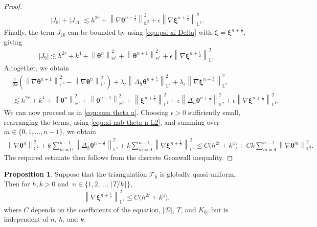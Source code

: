 \documentclass[11pt, reqno]{amsart}
\theoremstyle{definition}
\newtheorem{proposition}[theorem]{Proposition}
\theoremstyle{remark}
\numberwithin{equation}{section}
\newcommand{\bff}{\boldsymbol}
\newcommand{\bb}{\mathbb}
\newcommand{\norm}[2]{\left\|{#1}\right\|_{#2}}
\newcommand{\abs}[1]{\left|{#1}\right|}
\begin{document}
\begin{proof}
\begin{align*}
	\abs{J_8}+\abs{J_{11}}
	\lesssim
	h^{2r}+
	\norm{\nabla \bff{\theta}^{n+\frac{1}{2}}}{\bb{L}^2}^2 + \epsilon \norm{\nabla \bff{\xi}^{n+\frac{1}{2}}}{\bb{L}^2}^2.
\end{align*}
Finally, the term $J_{10}$ can be bounded by using \eqref{equ:psi xi Delta} with $\bff{\zeta}=\bff{\xi}^{n+\frac{1}{2}}$, giving
\begin{align*}
	\abs{J_9} 
	\lesssim
	h^{2r}+k^4+ \norm{\bff{\theta}^n}{\bb{H}^1}^2 + \norm{\bff{\theta}^{n+1}}{\bb{H}^1}^2
	+ \epsilon \norm{\nabla \bff{\xi}^{n+\frac{1}{2}}}{\bb{L}^2}^2.
\end{align*}
Altogether, we obtain
\begin{align*}
	&\frac{1}{2k} \left(\norm{\nabla \bff{\theta}^{n+1}}{\bb{L}^2}^2 - \norm{\nabla \bff{\theta}^n}{\bb{L}^2}^2 \right) 
	+
	\lambda_r \norm{\Delta_h \bff{\theta}^{n+\frac{1}{2}}}{\bb{L}^2}^2
	+
	\lambda_e \norm{\nabla \bff{\xi}^{n+\frac{1}{2}}}{\bb{L}^2}^2
	\\
	&\lesssim
	h^{2r}+k^4 + \norm{\bff{\theta}^n}{\bb{H}^1}^2 + \norm{\bff{\theta}^{n+1}}{\bb{H}^1}^2
	+
	\norm{\bff{\xi}^{n+\frac{1}{2}}}{\bb{L}^2}^2
	+ 
	\epsilon \norm{\Delta_h \bff{\theta}^{n+\frac{1}{2}}}{\bb{L}^2}^2
	+
	\epsilon \norm{\nabla \bff{\xi}^{n+\frac{1}{2}}}{\bb{L}^2}^2.
\end{align*}
We can now proceed as in \eqref{equ:sum theta n}. Choosing $\epsilon>0$ sufficiently small, rearranging the terms, using \eqref{equ:xi nab theta n L2}, and summing over~$m\in \{0,1,\ldots,n-1\}$, we obtain
\begin{align*}
	\norm{\nabla \bff{\theta}^n}{\bb{L}^2}^2
	+
	k \sum_{m=0}^{n-1} \norm{\Delta_h \bff{\theta}^{n+\frac{1}{2}}}{\bb{L}^2}^2
	+
	k \sum_{m=0}^{n-1} \norm{\nabla \bff{\xi}^{n+\frac{1}{2}}}{\bb{L}^2}^2
	\leq
	C \big(h^{2r}+k^4\big)
	+
	Ck \sum_{m=0}^{n-1} \norm{\nabla \bff{\theta}^m}{\bb{L}^2}^2.
\end{align*}
The required estimate then follows from the discrete Gronwall inequality.
\end{proof}

\begin{proposition}\label{pro:nab xi n half crank}
Suppose that the triangulation $\mathcal{T}_h$ is globally quasi-uniform. Then for $h, k>0$ and~$n\in \{1,2,\ldots,\lfloor T/k \rfloor\}$,
\begin{align*}
	\norm{\nabla \bff{\xi}^{n+\frac{1}{2}}}{\bb{L}^2}^2
	\leq
	C \big(h^{2r}+k^4 \big),
\end{align*}
where $C$ depends on the coefficients of the equation, $|\mathscr{D}|$, $T$, and $K_0$, but is independent of $n$, $h$, and $k$.
\end{proposition}
\end{document}
